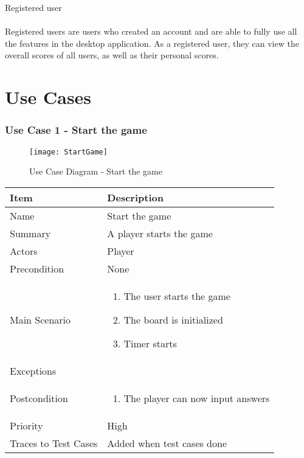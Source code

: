 \documentclass[12pt]{article}
\begin{document}
Registered user\\\\
Registered users are users who created an account and are able to fully use all the features in the desktop application. As a registered user, they can view the overall scores of all users, as well as their personal scores.\\


\section{Use Cases}
\subsubsection{Use Case 1 - Start the game} \label{uc:1}

\begin{figure}[htbp]
    \centering
    \texttt{[image: StartGame]}
    \caption{Use Case Diagram - Start the game}
    \label{fig:StartGame}
\end{figure}

\begin{center}
\setlength{\tabcolsep}{18pt}
\renewcommand{\arraystretch}{1.3}
\begin{tabular}{ |p{3cm}|p{10cm}| }
    \hline
    \rowcolor{green}
   Item & Description \\
    \hline
    Name & Start the game \\
    \hline
    Summary & A player starts the game \\
    \hline
    Actors & Player \\
    \hline
    Precondition & None \\
    \hline
    Main Scenario &     
    \vspace*{-0.2in}
    \begin{enumerate}
    \item The user starts the game
    \item The board is initialized
    \item Timer starts
    \end{enumerate}  \\
    \hline
    Exceptions &  \\
    \hline
    Postcondition & 
    \vspace*{-0.2in}
    \begin{enumerate}
    \item The player can now input answers
    \end{enumerate}  \\
    \hline
    Priority & High  \\
    \hline
    Traces to Test Cases & Added when test cases done  \\
    \hline
\end{tabular}
\end{center}
\end{document}
